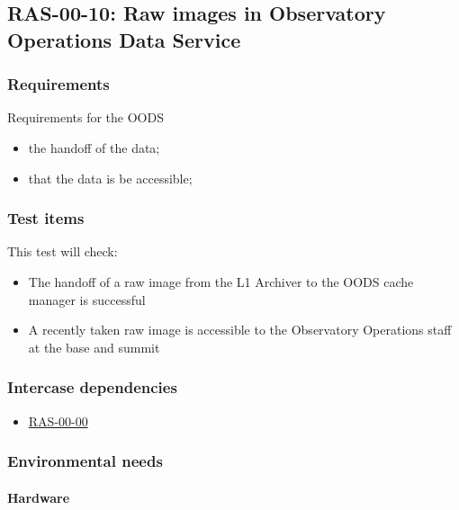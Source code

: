 \documentclass[DM,lsstdraft,STS,toc]{lsstdoc}
\begin{document}
\subsection{RAS-00-10: Raw images in Observatory Operations Data Service}
\label{ras-00-10}
\subsubsection{Requirements}
Requirements for the OODS
\begin{itemize}
\item{the handoff of the data;}
\item{that the data is be accessible;}

\end{itemize}




\subsubsection{Test items}
This test will check:
\begin{itemize}
\item{The handoff of a raw image from the L1 Archiver to the OODS cache
manager is successful}
\item{A recently taken raw image is accessible to the Observatory
Operations staff at the base and summit}
\end{itemize}


\subsubsection{Intercase dependencies}
\begin{itemize}
\item{\hyperref[ras-00-00]{RAS-00-00}}
\end{itemize}


\subsubsection{Environmental needs}
\paragraph{Hardware}
\end{document}
